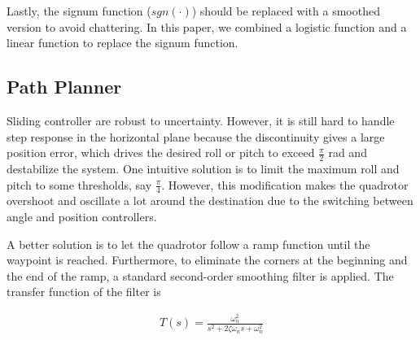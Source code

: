 \documentclass[journal,11pt,onecolumn,draftclsnofoot,]{IEEEtran}
\begin{document}
Lastly, the signum function ($sgn(\cdot)$) should be replaced with a smoothed version to avoid chattering. In this paper, we combined a logistic function and a linear function to replace the signum function.

%


\subsection{\textbf{Path Planner}} \label{path_planner_pos_ctrl}

Sliding controller are robust to uncertainty. However, it is still hard to handle step response in the horizontal plane because the discontinuity gives a large position error, which drives the desired roll or pitch to exceed $\frac{\pi}{2}$ rad and destabilize the system. One intuitive solution is to limit the maximum roll and pitch to some thresholds, say $\frac{\pi}{4}$. However, this modification makes the quadrotor overshoot and oscillate a lot around the destination due to the switching between angle and position controllers.

A better solution is to let the quadrotor follow a ramp function until the waypoint is reached. Furthermore, to eliminate the corners at the beginning and the end of the ramp, a standard second-order smoothing filter is applied. The transfer function of the filter is

\begin{equation}
\label{eq:TF}
\begin{split}
T(s) = \frac{\omega_n^2}{s^2 + 2\zeta\omega_n s + \omega_n^2}
\end{split}
\end{equation}
\end{document}
